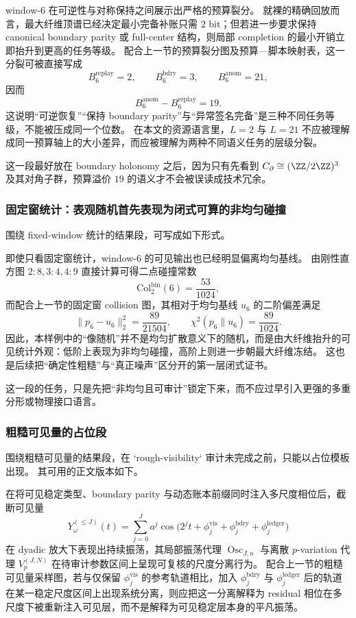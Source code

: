 window-\(6\) 在可逆性与对称保持之间展示出严格的预算裂分。
就裸的精确回放而言，最大纤维顶谱已经决定最小完备补账只需 \(2\) bit；但若进一步要求保持 canonical boundary parity 或 full-center 结构，则局部 completion 的最小开销立即抬升到更高的任务等级。
配合上一节的预算裂分图及预算—脚本映射表，这一分裂可被直接写成
\[
B_6^{\mathrm{replay}}=2,
\qquad
B_6^{\mathrm{bdry}}=3,
\qquad
B_6^{\mathrm{anom}}=21,
\]
因而
\[
B_6^{\mathrm{anom}}-B_6^{\mathrm{replay}}=19.
\]
这说明“可逆恢复”“保持 boundary parity”与“异常签名完备”是三种不同任务等级，不能被压成同一个位数。
在本文的资源语言里，\(L=2\) 与 \(L=21\) 不应被理解成同一预算轴上的大小差异，而应被理解为两种不同语义任务的层级分裂。

这一段最好放在 boundary holonomy 之后，因为只有先看到 \(C_{\partial}\cong (\ZZ/2\ZZ)^3\) 及其对角子群，预算溢价 \(19\) 的语义才不会被误读成技术冗余。

\subsubsection{固定窗统计：表观随机首先表现为闭式可算的非均匀碰撞}\label{subsubsec:typed-address-biaxial-completion-window6-results-fixed-window-statistics}
围绕 fixed-window 统计的结果段，可写成如下形式。

即使只看固定窗统计，window-\(6\) 的可见输出也已经明显偏离均匀基线。
由刚性直方图 \(2{:}8,3{:}4,4{:}9\) 直接计算可得二点碰撞常数
\[
\mathrm{Col}_2^{\mathrm{bin}}(6)=\frac{53}{1024},
\]
而配合上一节的固定窗 collision 图，其相对于均匀基线 \(u_6\) 的二阶偏差满足
\[
\|p_6-u_6\|_2^2=\frac{89}{21504},
\qquad
\chi^2(p_6\|u_6)=\frac{89}{1024}.
\]
因此，本样例中的“像随机”并不是均匀扩散意义下的随机，而是由大纤维抬升的可见统计外观：低阶上表现为非均匀碰撞，高阶上则进一步朝最大纤维冻结。
这也是后续把“确定性粗糙”与“真正噪声”区分开的第一层闭式证书。

这一段的任务，只是先把“非均匀且可审计”锁定下来，而不应过早引入更强的多重分形或物理接口语言。

\subsubsection{粗糙可见量的占位段}\label{subsubsec:typed-address-biaxial-completion-window6-results-rough-visibility-placeholder}
围绕粗糙可见量的结果段，在 `rough-visibility` 审计未完成之前，只能以占位模板出现。
其可用的正文版本如下。

在将可见稳定类型、boundary parity 与动态账本前缀同时注入多尺度相位后，截断可见量
\[
Y_\omega^{(\le J)}(t)
=
\sum_{j=0}^{J} a^j
\cos\!\bigl(
2^jt+\phi_j^{\mathrm{vis}}+\phi_j^{\mathrm{bdry}}+\phi_j^{\mathrm{ledger}}
\bigr)
\]
在 dyadic 放大下表现出持续振荡，其局部振荡代理 \(\operatorname{Osc}_{J,n}\) 与离散 \(p\)-variation 代理 \(V_p^{(J,N)}\) 在待审计参数区间上呈现可复核的尺度分离行为。
配合上一节的粗糙可见量采样图，若与仅保留 \(\phi_j^{\mathrm{vis}}\) 的参考轨道相比，加入 \(\phi_j^{\mathrm{bdry}}\) 与 \(\phi_j^{\mathrm{ledger}}\) 后的轨道在某一稳定尺度区间上出现系统分离，则应把这一分离解释为 residual 相位在多尺度下被重新注入可见层，而不是解释为可见稳定层本身的平凡振荡。

